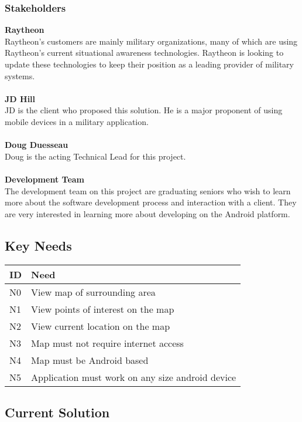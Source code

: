 \documentclass{article}
\begin{document}
\subsubsection{Stakeholders}
\textbf{Raytheon}\\
Raytheon's customers are mainly military organizations, many of which are using Raytheon's current situational awareness technologies.  Raytheon is looking to update these technologies to keep their position as a leading provider of military systems.\\ \\
\textbf{JD Hill}\\
JD is the client who proposed this solution.  He is a major proponent of using mobile devices in a military application.\\ \\
\textbf{Doug Duesseau}\\
Doug is the acting Technical Lead for this project. \\ \\
\textbf{Development Team}\\
The development team on this project are graduating seniors who wish to learn more about the software development process and interaction with a client.  They are very interested in learning more about developing on the Android platform.

\subsection{Key Needs}

\begin{tabular}{ | p{.5in} | p{4.5in} | }
\hline
\textbf{ID} & \textbf{Need}\\
\hline
\hline
N0 & View map of surrounding area\\
\hline
N1 & View points of interest on the map\\
\hline
N2 & View current location on the map\\
\hline
N3 & Map must not require internet access\\
\hline
N4 & Map must be Android based\\
\hline
N5 & Application must work on any size android device\\
\hline
\end{tabular}


\subsection{Current Solution}
\end{document}
